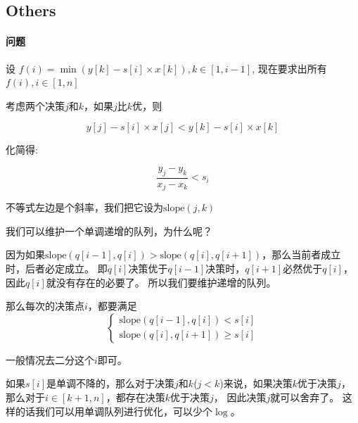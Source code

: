\documentclass[twoside]{article}
\begin{document}
\subsection{Others}
\paragraph{问题}
设 $f(i) = \min(y[k] - s[i] \times x[k]), k \in [1,i-1]$, 现在要求出所有$f(i), i \in [1,n]$

考虑两个决策$j$和$k$，如果$j$比$k$优，则

$$y[j] - s[i] \times x[j] < y[k] - s[i] \times x[k]$$

化简得:

$$\frac{y_j - y_k}{x_j - x_k} < s_i$$

不等式左边是个斜率，我们把它设为$\text{slope}(j,k)$

我们可以维护一个单调递增的队列，为什么呢？

因为如果$\text{slope}(q[i-1],q[i]) > \text{slope}(q[i],q[i+1])$，那么当前者成立时，后者必定成立。 即$q[i]$决策优于$q[i-1]$决策时，$q[i+1]$必然优于$q[i]$，因此$q[i]$就没有存在的必要了。 所以我们要维护递增的队列。

那么每次的决策点$i$，都要满足
$$\begin{cases}
    \text{slope}(q[i-1],q[i]) < s[i] \\
    \text{slope}(q[i],q[i+1]) \ge s[i]
\end{cases}$$

一般情况去二分这个$i$即可。

如果$s[i]$是单调不降的，那么对于决策$j$和$k$($j < k$)来说，如果决策$k$优于决策$j$，那么对于$i \in [k+1,n]$，都存在决策$k$优于决策$j$， 因此决策$j$就可以舍弃了。 这样的话我们可以用单调队列进行优化，可以少个$\log$。
\end{document}
